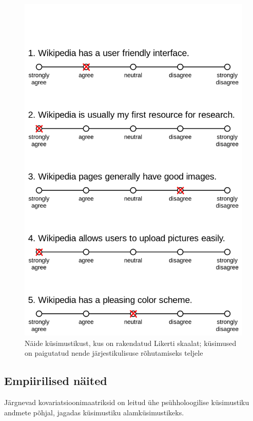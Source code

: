 \documentclass[a4paper,12pt,oneside]{article}
\numberwithin{equation}{section}
\theoremstyle{definition}
\begin{document}
\begin{subappendices}
\begin{figure}[H]
\centering
\includegraphics[width=1\textwidth]{Example_Likert_Scale.png}
\caption{Näide k\"usimustikust, kus on rakendatud Likerti skaalat; k\"usimused on paigutatud nende järjestikulisuse rõhutamiseks teljele\cite{Smith}}
\label{likert2}
\end{figure}



\subsection{Empiirilised näited}
\label{appendix:empiric}

Järgnevad kovariatsioonimaatriksid on leitud ühe psühholoogilise küsimustiku andmete põhjal, jagadas küsimustiku alamküsimustikeks. 



\end{subappendices}
\end{document}

